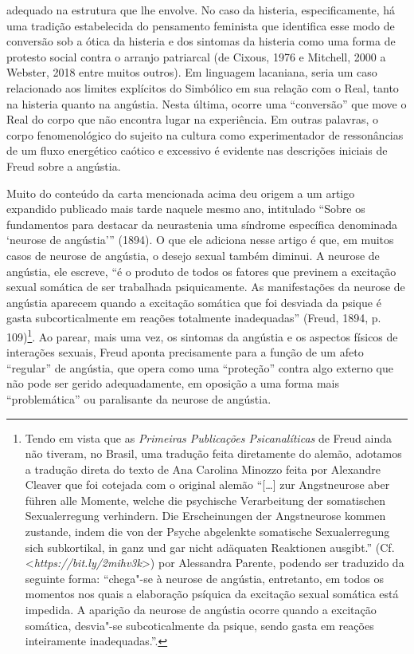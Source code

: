adequado na estrutura que lhe envolve. No caso da histeria,
especificamente, há uma tradição estabelecida do pensamento feminista
que identifica esse modo de conversão sob a ótica da histeria e dos
sintomas da histeria como uma forma de protesto social contra o arranjo
patriarcal (de Cixous, 1976 e Mitchell, 2000 a Webster, 2018 entre
muitos outros). Em linguagem lacaniana, seria um caso relacionado aos
limites explícitos do Simbólico em sua relação com o Real, tanto na
histeria quanto na angústia. Nesta última, ocorre uma ``conversão'' que
move o Real do corpo que não encontra lugar na experiência. Em outras
palavras, o corpo fenomenológico do sujeito na cultura como
experimentador de ressonâncias de um fluxo energético caótico e
excessivo é evidente nas descrições iniciais de Freud sobre a angústia.

Muito do conteúdo da carta mencionada acima deu origem a um artigo
expandido publicado mais tarde naquele mesmo ano, intitulado ``Sobre os
fundamentos para destacar da neurastenia uma síndrome específica
denominada `neurose de angústia''' (1894). O que ele adiciona nesse
artigo é que, em muitos casos de neurose de angústia, o desejo sexual
também diminui. A neurose de angústia, ele escreve, ``é o produto de
todos os fatores que previnem a excitação sexual somática de ser
trabalhada psiquicamente. As manifestações da neurose de angústia
aparecem quando a excitação somática que foi desviada da psique é gasta
subcorticalmente em reações totalmente inadequadas'' (Freud, 1894, p.
109)\footnote{Tendo em vista que as \emph{Primeiras Publicações
  Psicanalíticas} de Freud ainda não tiveram, no Brasil, uma tradução
  feita diretamente do alemão, adotamos a tradução direta do texto de
  Ana Carolina Minozzo feita por Alexandre Cleaver que foi cotejada com
  o original alemão ``{[}\ldots{}{]} zur Angstneurose aber führen alle
  Momente, welche die psychische Verarbeitung der somatischen
  Sexualerregung verhindern. Die Erscheinungen der Angstneurose kommen
  zustande, indem die von der Psyche abgelenkte somatische
  Sexualerregung sich subkortikal, in ganz und gar nicht adäquaten
  Reaktionen ausgibt.'' (Cf. \textless{}\emph{https://bit.ly/2mihv3k}\textgreater{})
  por Alessandra Parente, podendo ser traduzido da seguinte forma:
  ``chega"-se à neurose de angústia, entretanto, em todos os momentos nos
  quais a elaboração psíquica da excitação sexual somática está
  impedida. A aparição da neurose de angústia ocorre quando a excitação
  somática, desvia"-se subcoticalmente da psique, sendo gasta em reações
  inteiramente inadequadas.''.}. Ao parear, mais uma vez, os sintomas da
angústia e os aspectos físicos de interações sexuais, Freud aponta
precisamente para a função de um afeto ``regular'' de angústia, que
opera como uma ``proteção'' contra algo externo que não pode ser gerido
adequadamente, em oposição a uma forma mais ``problemática'' ou
paralisante da neurose de angústia.

